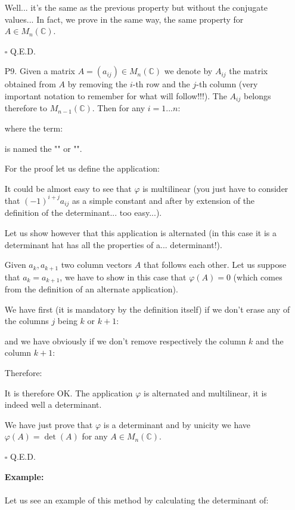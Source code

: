 \begin{enumerate}
		\begin{dem}
		Well... it's the same as the previous property but without the conjugate values... In fact, we prove in the same way, the same property for $A\in M_n(\mathbb{C})$.
		\begin{flushright}
			$\square$  Q.E.D.
		\end{flushright}
		\end{dem}
		
		\item[P9.] Given a matrix $A=(a_{ij})\in M_n(\mathbb{C})$ we denote by $A_{ij}$ the matrix obtained from $A$ by removing the $i$-th row and the $j$-th column (very important notation to remember for what will follow!!!). The $A_{ij}$ belongs therefore to $M_{n-1}(\mathbb{C})$. Then for any $i=1...n$:
		
		where the term:
		
		is named the "" or "\label{partial determinant}".
		\begin{dem}
		For the proof let us define the application:
		
		It could be almost easy to see that $\varphi$ is multilinear (you just have to consider that $(-1)^{i+j}a_{ij}$ as a simple constant and after by extension of the definition of the determinant... too easy...).

		Let us show however that this application is alternated (in this case it is a determinant hat has all the properties of a... determinant!).
	
		Given $a_k,a_{k+1}$ two column vectors $A$ that follows each other. Let us suppose that $a_k=a_{k+1}$, we have to show in this case that $\varphi(A)=0$ (which comes from the definition of an alternate application).
	
		We have first (it is mandatory by the definition itself) if we don't erase any of the columns $j$ being $k$ or $k+1$:
		
		and we have obviously if we don't remove respectively the column $k$ and the column $k+1$:
		
		Therefore:
		
		It is therefore OK. The application $\varphi$ is alternated and multilinear, it is indeed well a determinant.
		
		We have just prove that $\varphi$ is a determinant and by unicity we have $\varphi(A)=\det(A)$ for any $A\in M_n(\mathbb{C})$.
		\begin{flushright}
			$\square$  Q.E.D.
		\end{flushright}
		\end{dem}
		\begin{tcolorbox}[colframe=black,colback=white,sharp corners]
		\textbf{{\Large {}}Example:}\\\\
		Let us see an example of this method by calculating the determinant of: 
		

\end{tcolorbox}
\end{enumerate}
